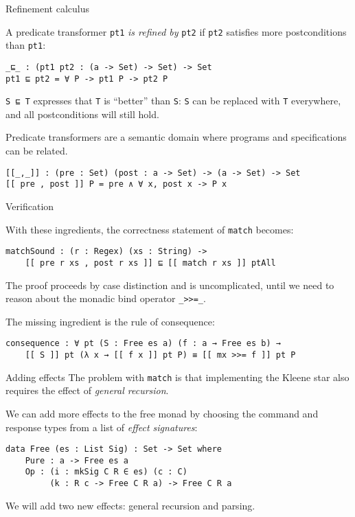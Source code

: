 \documentclass{beamer}
\newcommand{\Agda}[1]{\texttt{\footnotesize #1}\xspace}
\newcommand{\match}{\Agda{match}}
\begin{document}
\begin{frame}[fragile]{Refinement calculus}

A predicate transformer \Agda{pt1} \emph{is refined by} \Agda{pt2} if \Agda{pt2} satisfies more postconditions than \Agda{pt1}:
\vspace{-\baselineskip}
\begin{verbatim}
_⊑_ : (pt1 pt2 : (a -> Set) -> Set) -> Set
pt1 ⊑ pt2 = ∀ P -> pt1 P -> pt2 P
\end{verbatim}

\Agda{S ⊑ T} expresses that \Agda{T} is ``better'' than \Agda{S}:
\Agda{S} can be replaced with \Agda{T} everywhere, and all postconditions will still hold.

\vspace{\baselineskip}

\pause

Predicate transformers are a semantic domain where programs and specifications can be related.
\vspace{-\baselineskip}
\begin{verbatim}
[[_,_]] : (pre : Set) (post : a -> Set) -> (a -> Set) -> Set
[[ pre , post ]] P = pre ∧ ∀ x, post x -> P x
\end{verbatim}

\end{frame}

\begin{frame}[fragile]{Verification}

With these ingredients, the correctness statement of \match becomes:
\begin{verbatim}
matchSound : (r : Regex) (xs : String) ->
    [[ pre r xs , post r xs ]] ⊑ [[ match r xs ]] ptAll
\end{verbatim}

The proof proceeds by case distinction and is uncomplicated, until we need to reason about the monadic bind operator \Agda{\_>>=\_}.

\pause

The missing ingredient is the rule of consequence:
\begin{verbatim}
consequence : ∀ pt (S : Free es a) (f : a → Free es b) →
    [[ S ]] pt (λ x → [[ f x ]] pt P) ≡ [[ mx >>= f ]] pt P
\end{verbatim}

\end{frame}

\begin{frame}[fragile]{Adding effects}
The problem with \match is that implementing the Kleene star also requires the effect of \emph{general recursion}.

We can add more effects to the free monad by choosing the command and response types from a list of \emph{effect signatures}:
\begin{verbatim}
data Free (es : List Sig) : Set -> Set where
    Pure : a -> Free es a
    Op : (i : mkSig C R ∈ es) (c : C)
         (k : R c -> Free C R a) -> Free C R a
\end{verbatim}

We will add two new effects: general recursion and parsing.
\end{frame}
\end{document}
